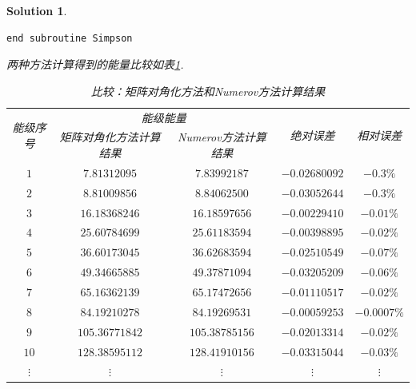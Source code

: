 \documentclass[UTF8,10pt,a4paper]{article}
\theoremstyle{Problem}
\theoremstyle{Solution}
\newtheorem*{sol}{Solution}
\begin{document}
\begin{sol}
\begin{lstlisting}
end subroutine Simpson
    \end{lstlisting}
    两种方法计算得到的能量比较如表\ref{3}.
    \begin{table}[h]
        \centering
        \caption{比较：矩阵对角化方法和Numerov方法计算结果}
        \label{3}
        \begin{tabular}{ccccc}
            \hline
            \multirow{2}{*}{能级序号} & \multicolumn{2}{c}{能级能量} & \multirow{2}{*}{绝对误差} & \multirow{2}{*}{相对误差}               \\ \cline{2-3}
                                      & 矩阵对角化方法计算结果       & Numerov方法计算结果       &                           &             \\ \hline
            $1$                       & $7.81312095$                 & $7.83992187$              & $-0.02680092$             & $-0.3\%$    \\
            $2$                       & $8.81009856$                 & $8.84062500$              & $-0.03052644$             & $-0.3\%$    \\
            $3$                       & $16.18368246$                & $16.18597656$             & $-0.00229410$             & $-0.01\%$   \\
            $4$                       & $25.60784699$                & $25.61183594$             & $-0.00398895$             & $-0.02\%$   \\
            $5$                       & $36.60173045$                & $36.62683594$             & $-0.02510549$             & $-0.07\%$   \\
            $6$                       & $49.34665885$                & $49.37871094$             & $-0.03205209$             & $-0.06\%$   \\
            $7$                       & $65.16362139$                & $65.17472656$             & $-0.01110517$             & $-0.02\%$   \\
            $8$                       & $84.19210278$                & $84.19269531$             & $-0.00059253$             & $-0.0007\%$ \\
            $9$                       & $105.36771842$               & $105.38785156$            & $-0.02013314$             & $-0.02\%$   \\
            $10$                      & $128.38595112$               & $128.41910156$            & $-0.03315044$             & $-0.03\%$   \\
            $\vdots$                  & $\vdots$                     & $\vdots$                  & $\vdots$                  & $\vdots$    \\

\end{tabular}
\end{table}
\end{sol}
\end{document}
